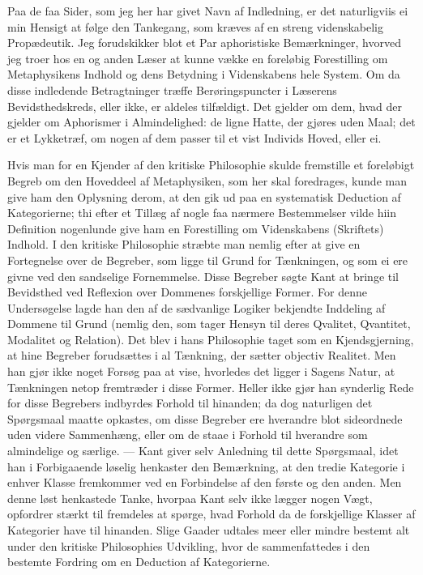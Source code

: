 \documentclass[12pt]{article}
\newcommand{\opage}[1]{\marginnote{\footnotesize\textit{[#1]}}}
\begin{document}
\opage{191}Paa de faa Sider, som jeg her har givet Navn af Indledning, er det
naturligviis ei min Hensigt at følge den Tankegang, som kræves af en streng
videnskabelig Propædeutik. Jeg forudskikker blot et Par aphoristiske
Bemærkninger, hvorved jeg troer hos en og anden Læser at kunne vække en
foreløbig Forestilling om Metaphysikens Indhold og dens Betydning i Videnskabens
hele System. Om da disse indledende Betragtninger træffe Berøringspuncter i
Læserens Bevidsthedskreds, eller ikke, er aldeles tilfældigt. Det gjelder om
dem, hvad der gjelder om Aphorismer i Almindelighed: de ligne Hatte, der gjøres
uden Maal; det er et Lykketræf, om nogen af dem passer til et vist Individs
Hoved, eller ei.

Hvis man for en Kjender af den kritiske Philosophie skulde fremstille et
foreløbigt Begreb om den Hoveddeel af Metaphysiken, som her skal foredrages,
kunde man give ham den Oplysning derom, at den gik ud paa en systematisk
Deduction af Kategorierne; thi efter et Tillæg af nogle faa nærmere Bestemmelser
vilde hiin Definition nogenlunde give ham en Forestilling om Videnskabens
(Skriftets) Indhold. I den kritiske Philosophie stræbte man nemlig efter at give
en Fortegnelse over de Begreber, som ligge til Grund for Tænkningen, og som ei
ere givne ved den sandselige Fornemmelse. Disse Begreber søgte Kant at bringe
til Bevidsthed ved Reflexion over Dommenes forskjellige Former. For denne
Undersøgelse lagde han den af de sædvanlige Logiker bekjendte Inddeling af
Dommene til Grund (nemlig den, som tager Hensyn til deres Qvalitet, Qvantitet,
Modalitet og Relation). Det blev i hans Philosophie taget som en Kjendsgjerning,
at hine Begreber forudsættes i al Tænkning, der sætter objectiv Realitet. Men
han gjør ikke noget Forsøg paa at vise, hvorledes det ligger i Sagens Natur, at
Tænkningen netop fremtræder i disse Former. Heller ikke gjør han synderlig Rede
for disse Begrebers indbyrdes Forhold til hinanden; da dog naturligen det
Spørgsmaal maatte \opage{192}opkastes, om disse Begreber ere hverandre blot
sideordnede uden videre Sammenhæng, eller om de staae i Forhold til hverandre
som almindelige og særlige. --- Kant giver selv Anledning til dette Spørgsmaal,
idet han i Forbigaaende løselig henkaster den Bemærkning, at den tredie
Kategorie i enhver Klasse fremkommer ved en Forbindelse af den første og den
anden. Men denne løst henkastede Tanke, hvorpaa Kant selv ikke lægger nogen
Vægt, opfordrer stærkt til fremdeles at spørge, hvad Forhold da de forskjellige
Klasser af Kategorier have til hinanden. Slige Gaader udtales meer eller mindre
bestemt alt under den kritiske Philosophies Udvikling, hvor de sammenfattedes i
den bestemte Fordring om en Deduction af Kategorierne.
\end{document}
